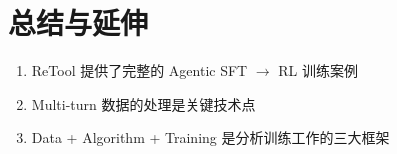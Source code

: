 \section{总结与延伸}
\begin{enumerate}
  \item ReTool 提供了完整的 Agentic SFT $\to$ RL 训练案例
  \item Multi-turn 数据的处理是关键技术点
  \item Data + Algorithm + Training 是分析训练工作的三大框架
\end{enumerate}

